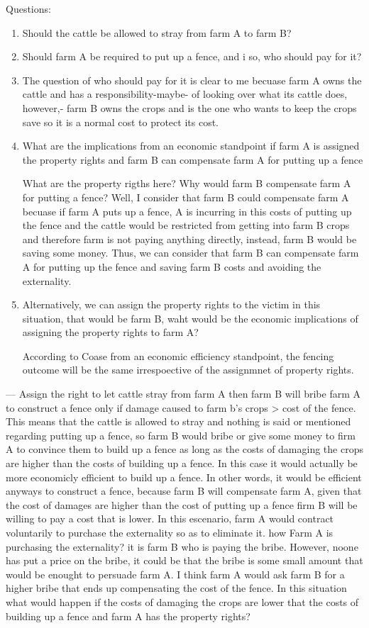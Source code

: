 \documentclass[11pt]{article} %
\begin{document}
Questions:
\begin{enumerate}
\item Should the cattle be allowed to stray from farm A to farm B?
\item Should farm A be required to put up a fence, and i so, who should pay for it?
\item The question of who should pay for it is clear to me becuase farm A owns the cattle and has a responsibility-maybe- of looking over what its cattle does, however,- farm B owns the crops and is the one who wants to keep the crops save so it is a normal cost to protect its cost.
\item What are the implications from an economic standpoint if farm A is assigned the property rights and farm B can compensate farm A for putting up a fence

What are the property rigths here? 
Why would farm B compensate farm A for putting a fence? 
Well, I consider that farm B could compensate farm A becuase if farm A puts up a fence, A is incurring in this costs of putting up the fence and the cattle would be restricted from getting into farm B crops and therefore farm is not paying anything directly, instead, farm B would be saving some money. 
Thus, we can consider that farm B can compensate farm A for putting up the fence and saving farm B costs and avoiding the externality.


\item Alternatively, we can assign the property rights to the victim in this situation, that would be farm B, waht would be the economic implications of assigning the property rights to farm A?

According to Coase from an economic efficiency standpoint, the fencing outcome will be the same irrespoective of the assignmnet of property rights.

\end{enumerate}


--- 
Assign the right to let cattle stray from farm A
then farm B will bribe farm A to construct a fence
only if damage caused to farm b's crops > cost of the fence.
This means that the cattle is allowed to stray and nothing is said or mentioned regarding putting up a fence, so farm B would bribe or give some money to firm A to convince them to build up a fence as long as the costs of damaging the crops are higher than the costs of building up a fence.
In this case it would actually be more economicly efficient to build up a fence.
In other words, it would be efficient anyways to construct a fence, because farm B will compensate farm A, given that the cost of damages are higher than the cost of putting up a fence firm B will be willing to pay a cost that is lower. In this escenario, farm A would contract voluntarily to purchase the externality so as to eliminate it. 
how Farm A is purchasing the externality? it is farm B who is paying the bribe. However, noone has put a price on the bribe, it could be that the bribe is some small amount that would be enought to persuade farm A. I think farm A would ask farm B for a higher bribe that ends up compensating the cost of the fence.
In this situation what would happen if the costs of damaging the crops are lower that the costs of building up a fence and farm A has the property rights?
\end{document}
